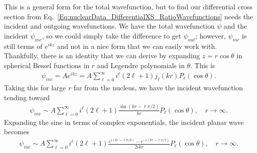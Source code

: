 
This is a general form for the total wavefunction, but to find our differential cross section from Eq.~\eqref{Eq:nuclearData_DifferentialXS_RatioWavefunctions} needs the incident and outgoing wavefunctions. We have the total wavefunction $\psi$ and the incident $\psi_{inc}$, so we could simply take the difference to get $\psi_{out}$; however, $\psi_{inc}$ is still terms of $e^{ikz}$ and not in a nice form that we can easily work with. Thankfully, there is an identity that we can derive by expanding $z = r\cos\theta$ in spherical Bessel functions in $r$ and Legendre polynomials in $\theta$. This is
\begin{align}
  \psi_{inc} = A e^{ikz} = A \sum_{\ell=0}^\infty i^\ell ( 2 \ell + 1 ) j_\ell(kr) P_\ell(\cos \theta) .
\end{align}
Taking this for large $r$ far from the nucleus, we have the incident wavefunction tending toward
\begin{align}
  \psi_{inc} \sim A \sum_{\ell=0}^\infty i^\ell ( 2 \ell + 1 ) \frac{ \sin(kr - \ell \pi/2 ) }{ kr } P_\ell(\cos \theta) , \quad r \rightarrow \infty .
\end{align}
Expanding the sine in terms of complex exponentials, the incident planar wave becomes
\begin{align} \label{Eq:nuclearData_incidentWavefunctionComplexExponentials}
  \psi_{inc} \sim A \sum_{\ell=0}^\infty i^\ell ( 2 \ell + 1 )  \frac{e^{i(kr - \ell \pi/2 )} - e^{-i(kr - \ell \pi/2 )} }{2ikr} P_\ell(\cos \theta) , \quad r \rightarrow \infty .
\end{align}

